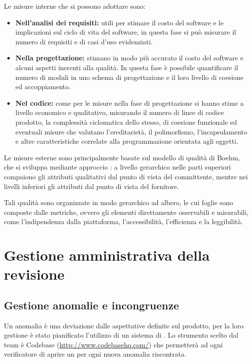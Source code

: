 Le misure interne che si possono adottare sono:
\begin{itemize}

\item \textbf{Nell'analisi dei requisiti:} utili per stimare il costo del software e le implicazioni sul ciclo di vita del software, in questa fase si può misurare il numero di requisiti e di casi d'uso evidenziati.

\item \textbf{Nella progettazione:} stimano in modo più accurato il costo del software e alcuni aspetti inerenti alla qualità. In questa fase è possibile quantificare il numero di moduli in uno schema di progettazione e il loro livello di coesione ed accoppiamento.

\item \textbf{Nel codice:} come per le misure nella fase di progettazione si hanno stime a livello economico e qualitativo, misurando il numero di linee di codice prodotto, la complessità ciclomatica dello stesso, di coesione funzionale ed eventuali misure  che valutano l'ereditarietà, il polimorfismo, l'incapsulamento e altre caratteristiche correlate alla programmazione orientata agli oggetti.
\end{itemize}

Le misure esterne sono principalmente basate sul modello di qualità di Boehm, che si sviluppa mediante approccio : a livello gerarchico nelle parti superiori compaiono gli attributi qualitativi dal punto di vista del committente, mentre nei livelli inferiori gli attributi dal punto di vista del fornitore.

Tali qualità sono organizzate in modo gerarchico ad albero, le cui foglie sono composte dalle metriche, ovvero gli elementi direttamente osservabili e misurabili, come l'indipendenza dalla piattaforma, l'accessibilità, l'efficienza e la leggibilità.
\clearpage

\section{Gestione amministrativa della revisione}

\subsection{Gestione anomalie e incongruenze}
Un anomalia è una deviazione dalle aspettative definite sul prodotto, per la loro gestione è stato pianificato l'utilizzo di un sistema di .
Lo strumento scelto dal team è Codebase (\url{http://www.codebasehq.com/}) che permetterà ad ogni verificatore di aprire un \underline{} per ogni nuova anomalia riscontrata.

